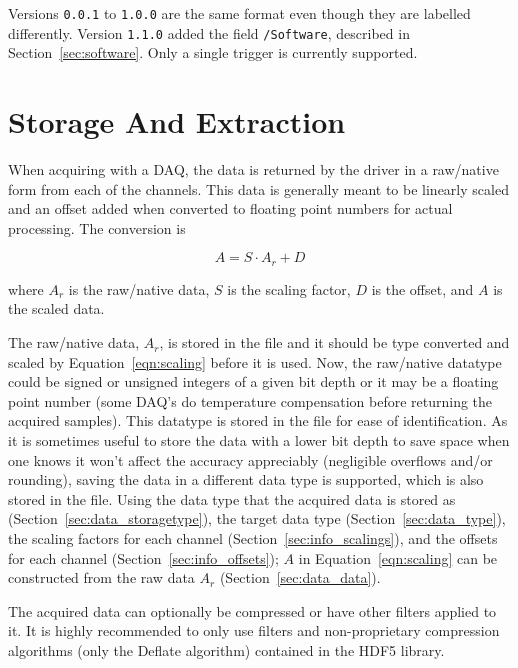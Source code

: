 \documentclass[12pt]{article} %
\begin{document}
Versions \verb|0.0.1| to \verb|1.0.0| are the same format even though they are labelled differently.
Version \verb|1.1.0| added the field \verb|/Software|, described in Section~\ref{sec:software}.
Only a single trigger is currently supported.

\section{Storage And Extraction}

When acquiring with a DAQ, the data is returned by the driver in a raw/native form from each of the channels.
This data is generally meant to be linearly scaled and an offset added when converted to floating point numbers for actual processing.
The conversion is

\begin{equation}
	\label{eqn:scaling}
	A = S \cdot A_r + D
\end{equation}

\noindent where $A_r$ is the raw/native data, $S$ is the scaling factor, $D$ is the offset, and $A$ is the scaled data.

The raw/native data, $A_r$, is stored in the file and it should be type converted and scaled by Equation~\ref{eqn:scaling} before it is used.
Now, the raw/native datatype could be signed or unsigned integers of a given bit depth or it may be a floating point number (some DAQ's do temperature compensation before returning the acquired samples).
This datatype is stored in the file for ease of identification.
As it is sometimes useful to store the data with a lower bit depth to save space when one knows it won't affect the accuracy appreciably (negligible overflows and/or rounding), saving the data in a different data type is supported, which is also stored in the file.
Using the data type that the acquired data is stored as (Section~\ref{sec:data_storagetype}), the target data type (Section~\ref{sec:data_type}), the scaling factors for each channel (Section~\ref{sec:info_scalings}), and the offsets for each channel (Section~\ref{sec:info_offsets}); $A$ in Equation~\ref{eqn:scaling} can be constructed from the raw data $A_r$ (Section~\ref{sec:data_data}).

The acquired data can optionally be compressed or have other filters applied to it.
It is highly recommended to only use filters and non-proprietary compression algorithms (only the Deflate algorithm) contained in the HDF5 library.
\end{document}

